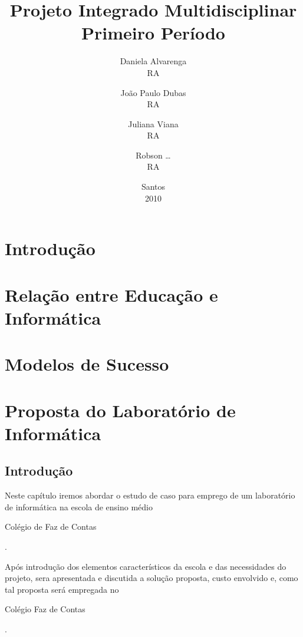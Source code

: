 \documentclass[a4paper,10pt]{report}
\begin{document}
    \title{Projeto Integrado Multidisciplinar\\Primeiro Período}
    \author{Daniela Alvarenga   \\RA
        \and João Paulo Dubas   \\RA
        \and Juliana Viana      \\RA
        \and Robson \ldots      \\RA}
    \date{Santos\\2010}

    \maketitle

    \tableofcontents

    \chapter{Introdução}

    \chapter[Educação versus Informática]{Relação entre Educação e Informática}

    \chapter{Modelos de Sucesso}

    \chapter[Laboratório]{Proposta do Laboratório de Informática}

        \section{Introdução}

            Neste capítulo iremos abordar o estudo de caso para emprego de um
            laboratório de informática na escola de ensino médio
            \begin{bfseries}Colégio de Faz de Contas\end{bfseries}.

            Após introdução dos elementos característicos da escola e das
            necessidades do projeto, sera apresentada e discutida a solução
            proposta, custo envolvido e, como tal proposta será empregada no
            \begin{bfseries}Colégio Faz de Contas\end{bfseries}.
\end{document}
